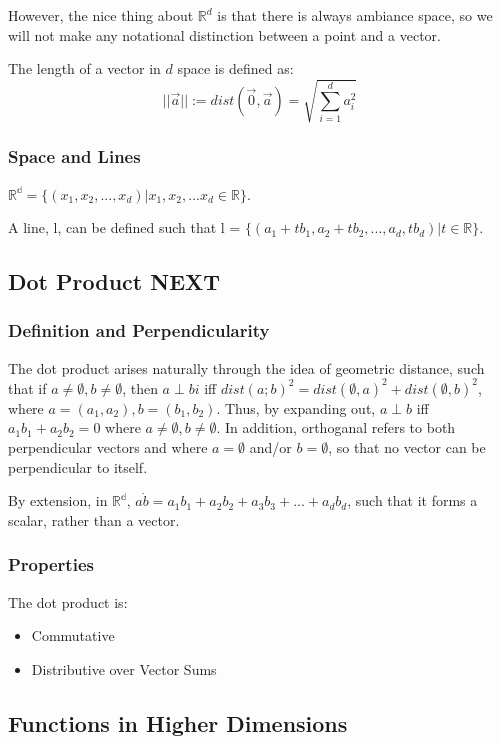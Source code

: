 \documentclass[11 pt, twoside]{article}
\begin{document}
However, the nice thing about $\mathbb{R}^d$ is that there is always ambiance
space, so we will not make any notational distinction between a point and a
vector.

The length of a vector in $d$ space is defined as:
$$||\vec{a}|| := dist(\vec{0}, \vec{a}) = \sqrt{\sum_{i =
1}^d a_i^2}$$

\subsubsection{Space and Lines}
$\mathbb{R^d} = \{(x_1, x_2, ..., x_d)|x_1, x_2, ... x_d \in \mathbb{R}\}$.

A line, l, can be defined such that l = $\{(a_1 + tb_1, a_2 + tb_2, ..., a_d, tb_d)|t \in \mathbb{R}\}$.

\subsection{Dot Product NEXT}
\subsubsection{Definition and Perpendicularity}
The dot product arises naturally through the idea of geometric distance, such that if $a \neq \emptyset, b \neq \emptyset$, then $a \perp bi$ iff $dist(a; b)^2 = dist(\emptyset, a)^2 + dist(\emptyset, b)^2$, where $a = (a_1, a_2), b = (b_1, b_2)$. Thus, by expanding out, $a \perp b$ iff $a_1b_1 + a_2b_2 = 0$ where $a \neq \emptyset, b \neq \emptyset$. In addition, orthoganal refers to both perpendicular vectors and where $a = \emptyset$ and/or $b = \emptyset$, so that no vector can be perpendicular to itself.

By extension, in $\mathbb{R^d}$, $a \dot b = a_1b_1 + a_2b_2 + a_3b_3 +...+ a_db_d$, such that it forms a scalar, rather than a vector.

\subsubsection{Properties}
The dot product is:
\begin{itemize}
\item Commutative
\item Distributive over Vector Sums
\end{itemize}

\subsection{Functions in Higher Dimensions}
\end{document}
